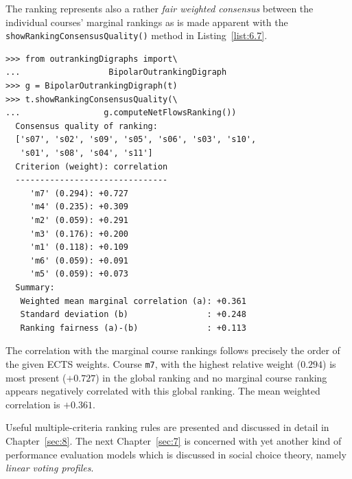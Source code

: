 The \NetFlows ranking represents also a rather \emph{fair weighted consensus} between the individual courses' marginal rankings as is made apparent with the \texttt{showRankingConsensusQuality()} method in Listing~\vref{list:6.7}.
\begin{lstlisting}[caption={Consensus quality of the students's ranking},label=list:6.7]
>>> from outrankingDigraphs import\
...                  BipolarOutrankingDigraph
>>> g = BipolarOutrankingDigraph(t)
>>> t.showRankingConsensusQuality(\
...                 g.computeNetFlowsRanking())
  Consensus quality of ranking:
  ['s07', 's02', 's09', 's05', 's06', 's03', 's10',
   's01', 's08', 's04', 's11']
  Criterion (weight): correlation
  -------------------------------
     'm7' (0.294): +0.727
     'm4' (0.235): +0.309
     'm2' (0.059): +0.291
     'm3' (0.176): +0.200
     'm1' (0.118): +0.109
     'm6' (0.059): +0.091
     'm5' (0.059): +0.073
  Summary:
   Weighted mean marginal correlation (a): +0.361
   Standard deviation (b)                : +0.248
   Ranking fairness (a)-(b)              : +0.113
\end{lstlisting}

The correlation with the marginal course rankings follows precisely the order of the given ECTS weights. Course \texttt{m7}, with the highest relative weight ($0.294$) is most present ($+0.727$) in the global \NetFlows ranking and no marginal course ranking appears negatively correlated with this global ranking. The mean weighted correlation is $+0.361$.

\vspace{\baselineskip}
Useful multiple-criteria ranking rules are presented and discussed in detail in Chapter~\ref{sec:8}. The next Chapter~\ref{sec:7} is concerned with yet another kind of performance evaluation models which is discussed in social choice theory, namely \emph{linear voting profiles}.

% 


